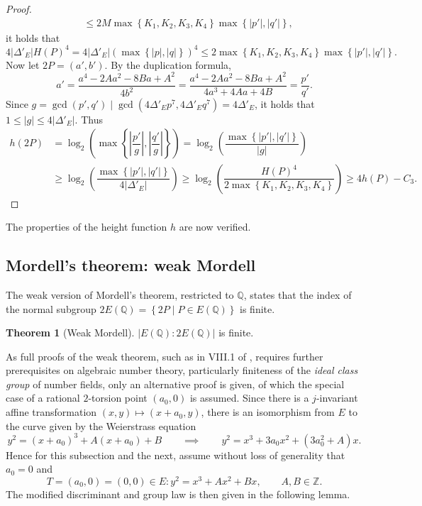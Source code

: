 \documentclass{article}
\newcommand{\Z}{\mathbb{Z}}
\newcommand{\Q}{\mathbb{Q}}
\newcommand{\rb}[1]{\left( #1 \right)}
\newcommand{\cb}[1]{\left\{ #1 \right\}}
\newcommand{\abs}[1]{\left\lvert #1 \right\rvert}
\theoremstyle{definition}
\newtheorem{theorem}[proposition]{Theorem}
\begin{document}
\begin{proof}
\begin{align*}
& \le 2M\max\cb{K_1, K_2, K_3, K_4}\max\cb{\abs{p'}, \abs{q'}},
\end{align*}
it holds that
$$ 4\abs{\Delta'_E}H\rb{P}^4 = 4\abs{\Delta'_E}\rb{\max\cb{\abs{p}, \abs{q}}}^4 \le 2\max\cb{K_1, K_2, K_3, K_4}\max\cb{\abs{p'}, \abs{q'}}. $$
Now let $ 2P = \rb{a', b'} $. By the duplication formula,
$$ a' = \dfrac{a^4 - 2Aa^2 - 8Ba + A^2}{4b^2} = \dfrac{a^4 - 2Aa^2 - 8Ba + A^2}{4a^3 + 4Aa + 4B} = \dfrac{p'}{q'}. $$
Since $ g = \gcd\rb{p', q'} \mid \gcd\rb{4\Delta'_E p^7, 4\Delta'_E q^7} = 4\Delta'_E $, it holds that $ 1 \le \abs{g} \le 4\abs{\Delta'_E} $. Thus
\begin{align*}
h\rb{2P}
& = \log_2\rb{\max\cb{\abs{\dfrac{p'}{g}}, \abs{\dfrac{q'}{g}}}}
= \log_2\rb{\dfrac{\max\cb{\abs{p'}, \abs{q'}}}{\abs{g}}} \\
& \ge \log_2\rb{\dfrac{\max\cb{\abs{p'}, \abs{q'}}}{4\abs{\Delta'_E}}}
\ge \log_2\rb{\dfrac{H\rb{P}^4}{2\max\cb{K_1, K_2, K_3, K_4}}}
\ge 4h\rb{P} - C_3.
\end{align*}
\end{proof}

The properties of the height function $ h $ are now verified.

\pagebreak

\subsection{Mordell's theorem: weak Mordell}

The weak version of Mordell's theorem, restricted to $ \Q $, states that the index of the normal subgroup $ 2E\rb{\Q} = \cb{2P \mid P \in E\rb{\Q}} $ is finite.

\begin{theorem}[Weak Mordell]
\label{thm:weakmordell}
$ \abs{E\rb{\Q} : 2E\rb{\Q}} $ is finite.
\end{theorem}

As full proofs of the weak theorem, such as in VIII.1 of \cite{gtm}, requires further prerequisites on algebraic number theory, particularly finiteness of the \emph{ideal class group} of number fields, only an alternative proof is given, of which the special case of a rational $ 2 $-torsion point $ \rb{a_0, 0} $ is assumed. Since there is a $ j $-invariant affine transformation $ \rb{x, y} \mapsto \rb{x + a_0, y} $, there is an isomorphism from $ E $ to the curve given by the Weierstrass equation
$$ y^2 = \rb{x + a_0}^3 + A\rb{x + a_0} + B \qquad \implies \qquad y^2 = x^3 + 3a_0x^2 + \rb{3a_0^2 + A}x. $$
Hence for this subsection and the next, assume without loss of generality that $ a_0 = 0 $ and
$$ T = \rb{a_0, 0} = \rb{0, 0} \in E : y^2 = x^3 + Ax^2 + Bx, \qquad A, B \in \Z. $$
The modified discriminant and group law is then given in the following lemma.
\end{document}
